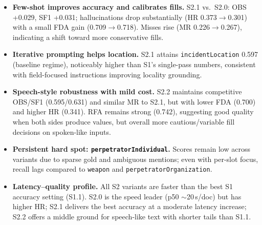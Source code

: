 \begin{itemize}
    \item \textbf{Few-shot improves accuracy and calibrates fills.} S2.1 vs.\ S2.0: OBS +0.029, SF1 +0.031; hallucinations drop substantially (HR 0.373$\rightarrow$0.301) with a small FDA gain (0.709$\rightarrow$0.718). Misses rise (MR 0.226$\rightarrow$0.267), indicating a shift toward more conservative fills.
    \item \textbf{Iterative prompting helps location.} S2.1 attains \texttt{incidentLocation} 0.597 (baseline regime), noticeably higher than S1’s single-pass numbers, consistent with field-focused instructions improving locality grounding.
    \item \textbf{Speech-style robustness with mild cost.} S2.2 maintains competitive OBS/SF1 (0.595/0.631) and similar MR to S2.1, but with lower FDA (0.700) and higher HR (0.341). RFA remains strong (0.742), suggesting good quality when both sides produce values, but overall more cautious/variable fill decisions on spoken-like inputs.
    \item \textbf{Persistent hard spot: \texttt{perpetratorIndividual}.} Scores remain low across variants due to sparse gold and ambiguous mentions; even with per-slot focus, recall lags compared to \texttt{weapon} and \texttt{perpetratorOrganization}.
    \item \textbf{Latency–quality profile.} All S2 variants are faster than the best S1 accuracy setting (S1.1). S2.0 is the speed leader (p50 $\sim$20\,s/doc) but has higher HR; S2.1 delivers the best accuracy at a moderate latency increase; S2.2 offers a middle ground for speech-like text with shorter tails than S1.1.
\end{itemize}
